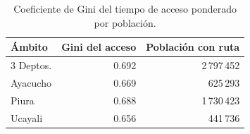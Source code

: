 \begin{table}[H]
\centering
\small
\caption{Coeficiente de Gini del tiempo de acceso ponderado por población.}
\label{tab:gini}
\begin{tabular}{lrr}
\toprule
Ámbito & Gini del acceso & Población con ruta \\
\midrule
3 Deptos. & 0.692 & 2\,797\,452 \\
\addlinespace[2.5pt]
Ayacucho & 0.669 & 625\,293 \\
\addlinespace[2.5pt]
Piura & 0.688 & 1\,730\,423 \\
\addlinespace[2.5pt]
Ucayali & 0.656 & 441\,736 \\
\bottomrule
\end{tabular}
\end{table}
